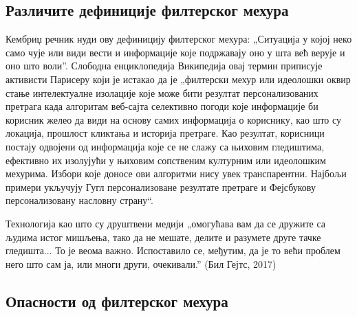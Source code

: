 \documentclass[a4paper]{article}
\begin{document}
\subsection{Различите дефиниције филтерског мехура}
\label{subsec:podnaslov4}

Кембриџ речник нуди ову дефиницију филтерског мехура: „Ситуација у којој неко само чује или види вести и информације које подржавају оно у шта већ верује и оно што воли”\cite{dictionary}. Слободна енциклопедија Википедија овај термин приписује активисти Парисеру који је истакао да је „филтерски мехур или идеолошки оквир стање интелектуалне изолације које може бити резултат персонализованих претрага када алгоритам веб-сајта селективно погоди које информације би корисник желео да види на основу самих информација о кориснику, као што су локација, прошлост кликтања и историја претраге. Као резултат, корисници постају одвојени од информација које се не слажу са њиховим гледиштима, ефективно их изолујући у њиховим сопственим културним или идеолошким мехурима. Избори које доносе ови алгоритми нису увек транспарентни. Најбољи примери укључују Гугл персонализоване резултате претраге и Фејсбукову персонализовану насловну страну“.\cite{wiki}

Технологија као што су друштвени медији „омогућава вам да се дружите са људима истог мишљења, тако да не мешате, делите и разумете друге тачке гледишта... То је веома важно. Испоставило се, међутим, да је то већи проблем него што сам ја, или многи други, очекивали.” (Бил Гејтс, 2017)



\subsection{Опасности од филтерског мехура}
\label{subsec:podnaslov5}
\end{document}
